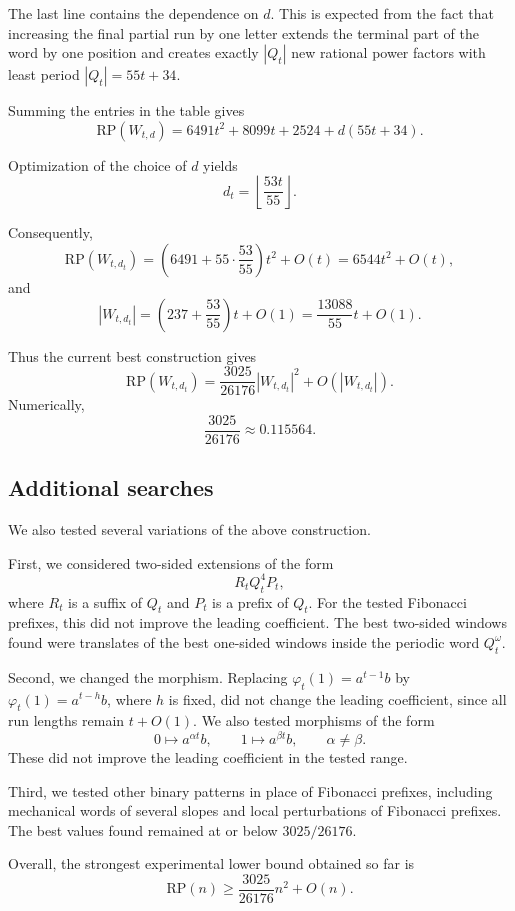 \documentclass[runningheads,envcountsame,a4paper]{llncs}
\newcommand{\rp}{\mathrm{RP}}
\begin{document}
The last line contains the dependence on $d$. This is expected from the
fact that increasing the final partial run by one letter extends the
terminal part of the word by one position and creates exactly $|Q_t|$
new rational power factors with least period $|Q_t|=55t+34$.

Summing the entries in the table gives
\[
    \rp(W_{t,d})
    =
    6491t^2+8099t+2524+d(55t+34).
\]

Optimization of the choice of $d$ yields
\[
    d_t=\left\lfloor \frac{53t}{55}\right\rfloor.
\]

Consequently,
\[
    \rp(W_{t,d_t})=\left(6491+55\cdot\frac{53}{55}\right)t^2+O(t)=6544t^2+O(t),
\]
and
\[
    |W_{t,d_t}|=\left(237+\frac{53}{55}\right)t+O(1)=\frac{13088}{55}t+O(1).
\]

Thus the current best construction gives
\[
    \boxed{
    \rp(W_{t,d_t})
    =
    \frac{3025}{26176}|W_{t,d_t}|^2
    +O(|W_{t,d_t}|)
    }.
\]
Numerically,
\[
    \frac{3025}{26176}\approx 0.115564.
\]

\subsection{Additional searches}

We also tested several variations of the above construction.

First, we considered two-sided extensions of the form
\[
    R_tQ_t^4P_t,
\]
where $R_t$ is a suffix of $Q_t$ and $P_t$ is a prefix of $Q_t$. For the
tested Fibonacci prefixes, this did not improve the leading coefficient.
The best two-sided windows found were translates of the best one-sided
windows inside the periodic word $Q_t^\omega$.

Second, we changed the morphism. Replacing $\varphi_t(1)=a^{t-1}b$ by
$\varphi_t(1)=a^{t-h}b$, where $h$ is fixed, did not change the leading
coefficient, since all run lengths remain $t+O(1)$. We also tested
morphisms of the form
\[
    0\mapsto a^{\alpha t}b,\qquad
    1\mapsto a^{\beta t}b,
    \qquad \alpha\ne \beta.
\]
These did not improve the leading coefficient in the tested range.

Third, we tested other binary patterns in place of Fibonacci prefixes,
including mechanical words of several slopes and local perturbations of
Fibonacci prefixes. The best values found remained at or below
$3025/26176$.

Overall, the strongest experimental lower bound obtained so far is
\[
    \boxed{
    \rp(n)\ge \frac{3025}{26176}n^2+O(n)
    }.
\]
\fi
























\end{document}
